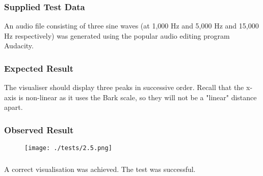 \subsubsection{Supplied Test Data}
An audio file consisting of three sine waves (at 1,000 Hz and 5,000 Hz and 15,000 Hz respectively) was generated using the popular audio editing program Audacity.

\subsubsection{Expected Result}
The visualiser should display three peaks in successive order. Recall that the x-axis is non-linear as it uses the Bark scale, so they will not be a "linear" distance apart.

\subsubsection{Observed Result}
\begin{figure}[H]
	\texttt{[image: ./tests/2.5.png]}
\end{figure}

\subsubsection{}
A correct visualisation was achieved. The test was successful.